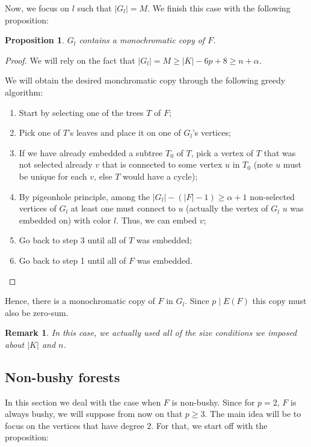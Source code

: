 \documentclass{article}
\numberwithin{table}{section}
\newtheorem{prop}[theorem]{Proposition}
\newtheorem{rem}[theorem]{Remark}
\begin{document}
Now, we focus on $l$ such that $|G_l|=M$. We finish this case with the following proposition:
\begin{prop}
    $G_l$ contains a monochromatic copy of $F$.
\end{prop}
\begin{proof}
We will rely on the fact that $|G_l| = M \geq |K|-6p+8 \geq n+\alpha$.

We will obtain the desired monchromatic copy through the following greedy algorithm:

\begin{enumerate}
    \item Start by selecting one of the trees $T$ of $F$;
    \item Pick one of $T$'s leaves and place it on one of $G_l$'s vertices;
    \item If we have already embedded a subtree $T_0$ of $T$, pick a vertex of $T$ that was not selected already $v$ that is connected to some vertex $u$ in $T_0$ (note $u$ must be unique for each $v$, else $T$ would have a cycle);
    \item By pigeonhole principle, among the $|G_l|-(|F|-1)\geq \alpha+1$ non-selected vertices of $G_l$ at least one must connect to $u$ (actually the vertex of $G_l$ $u$ was embedded on) with color $l$. Thus, we can embed $v$;
    \item Go back to step 3 until all of $T$ was embedded;
    \item Go back to step 1 until all of $F$ was embedded.
\end{enumerate}
\end{proof}

Hence, there is a monochromatic copy of $F$ in $G_l$. Since $p\mid E(F)$ this copy must also be zero-sum.
\begin{rem}\label{refbushynonvib}
    In this case, we actually used all of the size conditions we imposed about $|K|$ and $n$.
\end{rem}
\subsection{Non-bushy forests}\label{subsec:upper22}
In this section we deal with the case when $F$ is non-bushy. Since for $p=2$, $F$ is always bushy, we will suppose from now on that $p\geq 3$. The main idea will be to focus on the vertices that have degree $2$. For that, we start off with the proposition:
\end{document}
